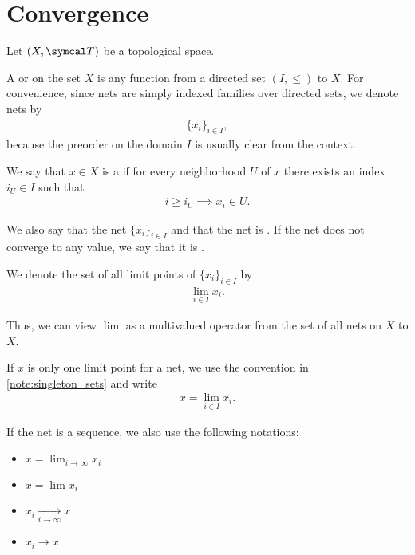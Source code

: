 \section{Convergence}\label{sec:convergence}

Let $(X, \Cal{T})$ be a topological space.

\begin{definition}\label{def:topological_net}\cite[49]{Engelking1989}
  A  or  on the set $X$ is any function from a directed set $(I, \leq)$ to $X$. For convenience, since nets are simply indexed families over directed sets, we denote nets by
  \begin{align*}
    \{ x_i \}_{i \in I},
  \end{align*}
  because the preorder on the domain $I$ is usually clear from the context.
\end{definition}

\begin{definition}\label{def:net_limit_point}\cite[49]{Engelking1989}
  We say that $x \in X$ is a  if for every neighborhood $U$ of $x$ there exists an index $i_U \in I$ such that
  \begin{align*}
    i \geq i_U \implies x_i \in U.
  \end{align*}

  We also say that the net $\{ x_i \}_{i \in I}$  and that the net is . If the net does not converge to any value, we say that it is .

  We denote the set of all limit points of $\{ x_i \}_{i \in I}$ by
  \begin{align*}
    \lim_{i \in I} x_i.
  \end{align*}

  Thus, we can view $\lim$ as a multivalued operator from the set of all nets on $X$ to $X$.

  If $x$ is only one limit point for a net, we use the convention in \cref{note:singleton_sets} and write
  \begin{align*}
    x = \lim_{i \in I} x_i.
  \end{align*}

  If the net is a sequence, we also use the following notations:
  \begin{itemize}
    \item $x = \lim_{i \to \infty} x_i$
    \item $x = \lim x_i$
    \item $x_i \xrightarrow[i \to \infty]{} x$
    \item $x_i \to x$
  \end{itemize}
\end{definition}

